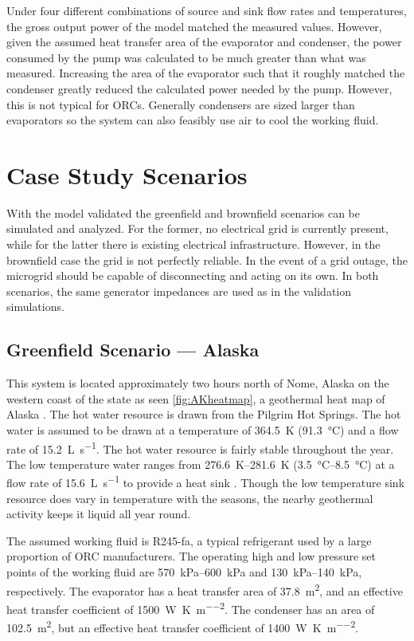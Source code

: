 Under four different combinations of source and sink flow rates and temperatures, the gross output power of the model matched the measured values. However, given the assumed heat transfer area of the evaporator and condenser, the power consumed by the pump was calculated to be much greater than what was measured. Increasing the area of the evaporator such that it roughly matched the condenser greatly reduced the calculated power needed by the pump. However, this is not typical for ORCs. Generally condensers are sized larger than evaporators so the system can also feasibly use air to cool the working fluid. 
\clearpage

\section{Case Study Scenarios}
With the model validated the greenfield and brownfield scenarios can be simulated and analyzed. For the former, no electrical grid is currently present, while for the latter there is existing electrical infrastructure. However, in the brownfield case the grid is not perfectly reliable. In the event of a grid outage, the microgrid should be capable of disconnecting and acting on its own. In both scenarios, the same generator impedances are used as in the validation simulations. 

\subsection{Greenfield Scenario --- Alaska}
This system is located approximately two hours north of Nome, Alaska on the western coast of the state as seen \autoref{fig:AKheatmap}, a geothermal heat map of Alaska \cite{Batir2013}. The hot water resource is drawn from the Pilgrim Hot Springs. The hot water is assumed to be drawn at a temperature of \SI{364.5}{\kelvin} (\SI{91.3}{\degreeCelsius}) and a flow rate of \SI{15.2}{\liter\per\second}. The hot water resource is fairly stable throughout the year. The low temperature water ranges from \SIrange{276.6}{281.6}{\kelvin} (\SIrange{3.5}{8.5}{\degreeCelsius}) at a flow rate of \SI{15.6}{\liter\per\second} to provide a heat sink \cite{Haselwimmer2013, AlaskaCenterforEnergyandPower2014}. Though the low temperature sink resource does vary in temperature with the seasons, the nearby geothermal activity keeps it liquid all year round.


The assumed working fluid is R245-fa, a typical refrigerant used by a large proportion of ORC manufacturers.
The operating high and low pressure set points of the working fluid are \SIrange{570}{600}{\kilo\pascal} and \SIrange{130}{140}{\kilo\pascal}, respectively. The evaporator has a heat transfer area of \SI{37.8}{\meter\squared}, and an effective heat transfer coefficient of \SI{1500}{\watt\per\kelvin\per\meter\squared}. The condenser has an area of \SI{102.5}{\meter\squared}, but an effective heat transfer coefficient of \SI{1400}{\watt\per\kelvin\per\meter\squared}.

